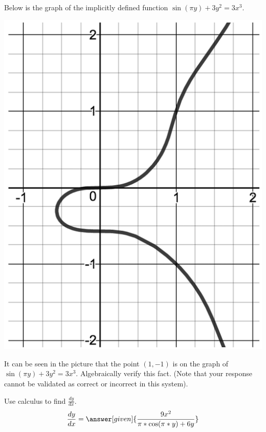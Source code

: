 \documentclass[handout]{ximera}
\begin{document}
\begin{problem}
Below is the graph of the implicitly defined function $\displaystyle\sin \left(\pi y\right)+3y^2=3x^3$. 


\includegraphics[scale=0.1]{Exam2-ImpDiff2scaled.png}


	\begin{question}
	It can be seen in the picture that the point $(1,-1)$ is on the graph of $\displaystyle\sin \left(\pi y\right)+3y^2=3x^3$. Algebraically verify this fact. (Note that your response cannot be validated as correct or incorrect in this system).\\
    \begin{freeResponse}
    \end{freeResponse}
    \end{question}
	
	\begin{question}
    Use calculus to find $\displaystyle\frac{dy}{dx}$.\\
    
    \[
    \displaystyle \dfrac{dy}{dx} = \answer[given]{\dfrac{9x^2}{\pi *\cos(\pi*y) + 6y}}
    \]
    \end{question}
    


\end{problem}
\end{document}
